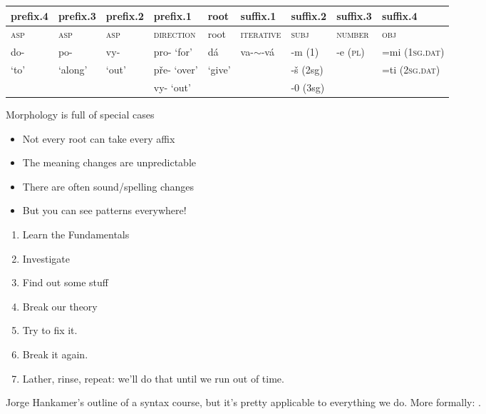 \documentclass[a4paper,landscape,headrule,footrule]{foils}
\begin{document}

\bigskip

\hspace*{-4em}
{\small
\begin{tabular}{|l|l|l|l|l|l|l|l|l|}
\hline
prefix.4	& prefix.3		& prefix.2		& prefix.1		& root 	& suffix.1 		& suffix.2	& suffix.3	& suffix.4\\
\hline
\textsc{asp} 	& \textsc{asp} 	& \textsc{asp} 	& \textsc{direction} 	& root 	& \textsc{iterative} 	& \textsc{subj}	& \textsc{number} 	& \textsc{obj}\\
 do- 	& po- & vy- & pro- `for' & dá 	& va-$\sim$-vá & -m (1) & -e (\textsc{pl}) & =mi (\textsc{1sg.dat}) \\
`to'	& `along' 	& `out'  & pře- `over' & `give' 	& 			& -š (2sg) & 			 & =ti (\textsc{2sg.dat}) \\
	&  	&  	& vy- `out' &  	& 			& -0 (3sg) & 			 & 					 \\	
\hline
\end{tabular}}

Morphology is full of special cases

\begin{itemize}
\item Not every root can take every affix
\item The meaning changes are unpredictable
\item There are often sound/spelling changes
\item But you can see patterns everywhere!
\end{itemize}

  
\begin{enumerate}\addtolength{\itemsep}{-1ex}
\item Learn the Fundamentals
\item Investigate
\item Find out some stuff
\item Break our theory
\item Try to fix it.
\item Break it again.
\item Lather, rinse, repeat: we'll do that until we run out of time.
\end{enumerate}

Jorge Hankamer's outline of a syntax course, but it's pretty
applicable to everything we do.  More formally: .
\end{document}
